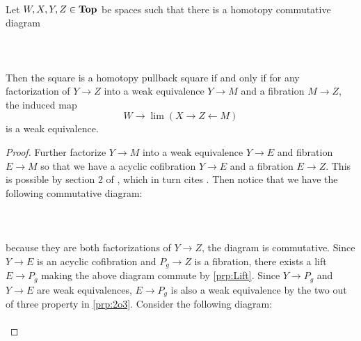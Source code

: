 \documentclass[a4paper]{article}
\begin{document}
\begin{prp}{}{}\\
Let $W,X,Y,Z\in\bold{Top}$ be spaces such that there is a homotopy commutative diagram  
 \\~\\  \\~\\
Then the square is a homotopy pullback square if and only if for any factorization of $Y\to Z$ into a weak equivalence $Y\to M$ and a fibration $M\to Z$, the induced map $$W\to\lim(X\rightarrow Z\leftarrow M)$$ is a weak equivalence. 
\begin{proof}
Further factorize $Y\to M$ into a weak equivalence $Y\to E$ and fibration $E\to M$ so that we have a acyclic cofibration $Y\to E$ and a fibration $E\to Z$. This is possible by section 2 of \cite{TBER}, which in turn cites \cite{NC}. Then notice that we have the following commutative diagram:  
 \\~\\  \\~\\
because they are both factorizations of $Y\to Z$, the diagram is commutative. Since $Y\to E$ is an acyclic cofibration and $P_g\to Z$ is a fibration, there exists a lift $E\to P_g$ making the above diagram commute by \ref{prp:Lift}. Since $Y\to P_g$ and $Y\to E$ are weak equivalences, $E\to P_g$ is also a weak equivalence by the two out of three property in \ref{prp:2o3}. Consider the following diagram: 
 \\~\\ 
\end{proof}
\end{prp}
\end{document}
